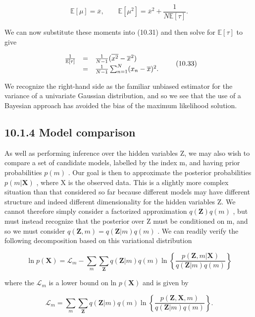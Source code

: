 \documentclass[
  10
]{article}
\begin{document}
\[
\mathbb {E} [ \mu ] = \overline {{x}}, \qquad \mathbb {E} [ \mu^ {2} ] = \overline {{x}} ^ {2} + \frac {1}{N \mathbb {E} [ \tau ]}.\tag{10.32}
\]

We can now substitute these moments into (10.31) and then solve for
\(\mathbb { E } [ \tau ]\) to give

\[
\begin{array}{r c l} \frac {1}{\mathbb {E} [ \tau ]} & = & \frac {1}{N - 1} (\overline {{x ^ {2}}} - \overline {{x}} ^ {2}) \\ & = & \frac {1}{N - 1} \sum_ {n = 1} ^ {N} (x _ {n} - \overline {{x}}) ^ {2}. \end{array}\tag{10.33}
\]

We recognize the right-hand side as the familiar unbiased estimator for
the variance of a univariate Gaussian distribution, and so we see that
the use of a Bayesian approach has avoided the bias of the maximum
likelihood solution.

\subsection{10.1.4 Model comparison}\label{model-comparison}

As well as performing inference over the hidden variables Z, we may also
wish to compare a set of candidate models, labelled by the index m, and
having prior probabilities \(p ( m )\) . Our goal is then to approximate
the posterior probabilities \(p ( m | \mathbf { X } )\) , where X is the
observed data. This is a slightly more complex situation than that
considered so far because different models may have different structure
and indeed different dimensionality for the hidden variables Z. We
cannot therefore simply consider a factorized approximation
\(q ( \mathbf { Z } ) q ( m )\) , but must instead recognize that the
posterior over Z must be conditioned on m, and so we must consider
\(q ( \mathbf { Z } , m ) = q ( \mathbf { Z } | m ) q ( m )\) . We can
readily verify the following decomposition based on this variational
distribution

\[
\ln p (\mathbf {X}) = \mathcal {L} _ {m} - \sum_ {m} \sum_ {\mathbf {Z}} q (\mathbf {Z} | m) q (m) \ln \left\{\frac {p (\mathbf {Z} , m | \mathbf {X})}{q (\mathbf {Z} | m) q (m)} \right\}\tag{10.34}
\]

where the \({ \mathcal { L } } _ { m }\) is a lower bound on ln
\(p ( \mathbf { X } )\) and is given by

\[
\mathcal {L} _ {m} = \sum_ {m} \sum_ {\mathbf {Z}} q (\mathbf {Z} | m) q (m) \ln \left\{\frac {p (\mathbf {Z} , \mathbf {X} , m)}{q (\mathbf {Z} | m) q (m)} \right\}.\tag{10.35}
\]
\end{document}
